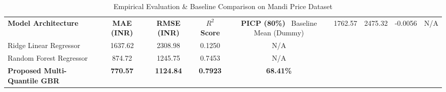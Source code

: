 \begin{table}[htbp]
\caption{Empirical Evaluation \& Baseline Comparison on Mandi Price Dataset}
\label{tab:model_evaluation}
\centering
\begin{tabular}{lcccc}
\hline
\textbf{Model Architecture} & \textbf{MAE (INR)} & \textbf{RMSE (INR)} & \textbf{$R^2$ Score} & \textbf{PICP (80\%)}\
\hline
Baseline Mean (Dummy) & 1762.57 & 2475.32 & -0.0056 & N/A \\
Ridge Linear Regressor & 1637.62 & 2308.98 & 0.1250 & N/A \\
Random Forest Regressor & 874.72 & 1245.75 & 0.7453 & N/A \\
\textbf{Proposed Multi-Quantile GBR} & \textbf{770.57} & \textbf{1124.84} & \textbf{0.7923} & \textbf{68.41\%} \\
\hline
\end{tabular}
\end{table}
